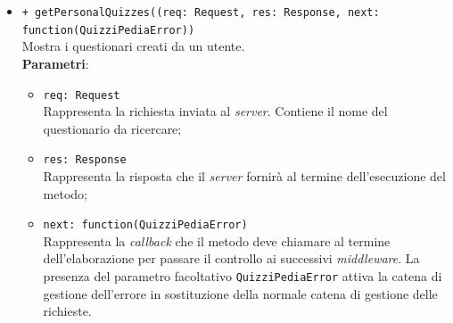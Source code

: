 \begin{itemize}
\begin{itemize}
		\item \texttt{+ getPersonalQuizzes((req: Request, res: Response, next: function(QuizziPediaError))}\\
			Mostra i questionari creati da un utente.\\
			\textbf{Parametri}:
			\begin{itemize}
				\item \texttt{req: Request}\\
			Rappresenta la richiesta inviata al \textit{server}. Contiene il nome del questionario da ricercare;
				\item \texttt{res: Response}\\
			Rappresenta la risposta che il \textit{server} fornirà al termine dell'esecuzione del metodo;
				\item \texttt{next: function(QuizziPediaError)}\\
			Rappresenta la \textit{callback} che il metodo deve chiamare al termine dell'elaborazione per passare il controllo ai successivi \textit{middleware}. La presenza del parametro facoltativo \texttt{QuizziPediaError} attiva la catena di gestione dell'errore in sostituzione della normale catena di gestione delle richieste.
			\end{itemize}
	\end{itemize}		
\end{itemize}